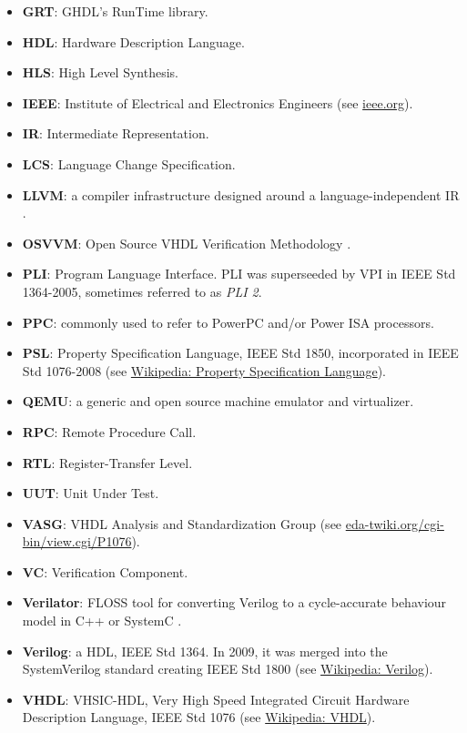 \documentclass[
]{article}
\begin{document}
\begin{itemize}
\item
  \textbf{GRT}: GHDL's RunTime library.
\item
  \textbf{HDL}: Hardware Description Language.
\item
  \textbf{HLS}: High Level Synthesis.
\item
  \textbf{IEEE}: Institute of Electrical and Electronics Engineers (see \href{https://www.ieee.org/}{ieee.org}).
\item
  \textbf{IR}: Intermediate Representation.
\item
  \textbf{LCS}: Language Change Specification.
\item
  \textbf{LLVM}: a compiler infrastructure designed around a language-independent IR \autocite{llvm}.
\item
  \textbf{OSVVM}: Open Source VHDL Verification Methodology \autocite{osvvm}.
\item
  \textbf{PLI}: Program Language Interface. PLI was superseeded by VPI in IEEE Std 1364-2005, sometimes referred to as \emph{PLI 2}.
\item
  \textbf{PPC}: commonly used to refer to PowerPC and/or Power ISA processors.
\item
  \textbf{PSL}: Property Specification Language, IEEE Std 1850, incorporated in IEEE Std 1076-2008 (see \href{https://en.wikipedia.org/wiki/Property_Specification_Language}{Wikipedia: Property Specification Language}).
\item
  \textbf{QEMU}: a generic and open source machine emulator and virtualizer.
\item
  \textbf{RPC}: Remote Procedure Call.
\item
  \textbf{RTL}: Register-Transfer Level.
\item
  \textbf{UUT}: Unit Under Test.
\item
  \textbf{VASG}: VHDL Analysis and Standardization Group (see \href{http://www.eda-twiki.org/cgi-bin/view.cgi/P1076}{eda-twiki.org/cgi-bin/view.cgi/P1076}).
\item
  \textbf{VC}: Verification Component.
\item
  \textbf{Verilator}: FLOSS tool for converting Verilog to a cycle-accurate behaviour model in C++ or SystemC \autocite{verilator}.
\item
  \textbf{Verilog}: a HDL, IEEE Std 1364. In 2009, it was merged into the SystemVerilog standard creating IEEE Std 1800 (see \href{https://en.wikipedia.org/wiki/Verilog}{Wikipedia: Verilog}).
\item
  \textbf{VHDL}: VHSIC-HDL, Very High Speed Integrated Circuit Hardware Description Language, IEEE Std 1076 (see \href{https://en.wikipedia.org/wiki/VHDL}{Wikipedia: VHDL}).


\end{itemize}
\end{document}
